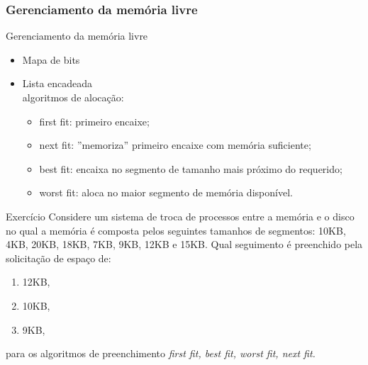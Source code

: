 \def\thetitle{Gerenciamento da memória livre}
\subsubsection{\thetitle}

\begin{frame}{\thetitle}
	
	\begin{itemize}
		\item Mapa de bits
		\item Lista encadeada\\ algoritmos de alocaç\~ao:
			\begin{itemize}
				\item first fit: primeiro encaixe;
				\item next fit: ''memoriza'' primeiro
					encaixe com mem\'oria suficiente;
				\item best fit: encaixa no segmento de tamanho
				mais pr\'oximo do requerido;
				\item worst fit: aloca no maior segmento
					de mem\'oria dispon\'ivel.					
			\end{itemize}
	\end{itemize}

\end{frame}

\begin{frame}{Exercício}
	\small
	Considere um sistema de troca de processos
	entre a memória e o disco no qual a memória
	é composta pelos seguintes tamanhos de segmentos:
	10KB, 4KB, 20KB, 18KB, 7KB, 9KB, 12KB e 15KB. 
	Qual seguimento 
	é preenchido pela solicitação de espaço de:
	\begin{enumerate}
	\item 12KB,
	\item 10KB,
	\item 9KB,
	\end{enumerate}
	para os algoritmos de preenchimento
	 {\em first fit, best fit, worst fit, next fit.}	
\end{frame}
